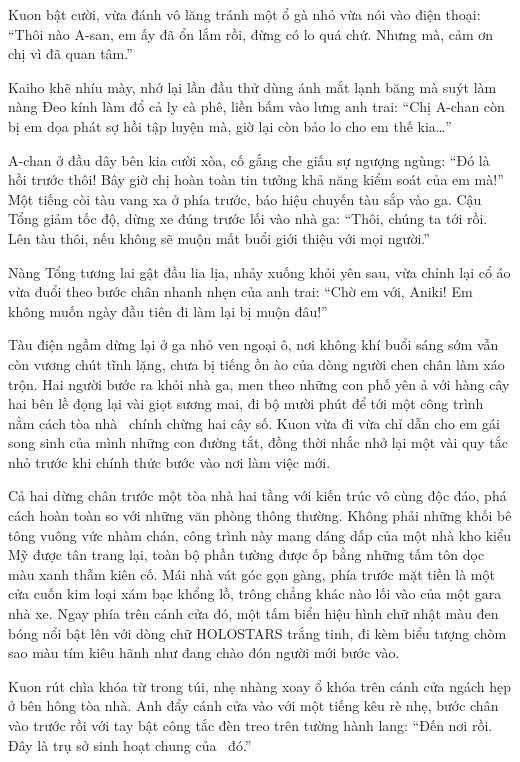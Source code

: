 \documentclass[../main.tex]{subfiles}
\begin{document}
Kuon bật cười, vừa đánh vô lăng tránh một ổ gà nhỏ vừa nói vào điện thoại: ``Thôi nào A-san, em ấy đã ổn lắm rồi, đừng có lo quá chứ. Nhưng mà, cảm ơn chị vì đã quan tâm.''

Kaiho khẽ nhíu mày, nhớ lại lần đầu thử dùng ánh mắt lạnh băng mà suýt làm nàng Đeo kính làm đổ cả ly cà phê, liền bấm vào lưng anh trai: ``Chị A-chan còn bị em dọa phát sợ hồi tập luyện mà, giờ lại còn bảo lo cho em thế kia\dots''

A-chan ở đầu dây bên kia cười xòa, cố gắng che giấu sự ngượng ngùng: ``Đó là hồi trước thôi! Bây giờ chị hoàn toàn tin tưởng khả năng kiểm soát của em mà!'' Một tiếng còi tàu vang xa ở phía trước, báo hiệu chuyến tàu sắp vào ga. Cậu Tổng giảm tốc độ, dừng xe đúng trước lối vào nhà ga: ``Thôi, chúng ta tới rồi. Lên tàu thôi, nếu không sẽ muộn mất buổi giới thiệu với mọi người.''

Nàng Tổng tương lai gật đầu lia lịa, nhảy xuống khỏi yên sau, vừa chỉnh lại cổ áo vừa đuổi theo bước chân nhanh nhẹn của anh trai: ``Chờ em với, Aniki! Em không muốn ngày đầu tiên đi làm lại bị muộn đâu!''

\ct

Tàu điện ngầm dừng lại ở ga nhỏ ven ngoại ô, nơi không khí buổi sáng sớm vẫn còn vương chút tĩnh lặng, chưa bị tiếng ồn ào của dòng người chen chân làm xáo trộn. Hai người bước ra khỏi nhà ga, men theo những con phố yên ả với hàng cây hai bên lề đọng lại vài giọt sương mai, đi bộ mười phút để tới một công trình nằm cách tòa nhà \hll\ chính chừng hai cây số. Kuon vừa đi vừa chỉ dẫn cho em gái song sinh của mình những con đường tắt, đồng thời nhắc nhở lại một vài quy tắc nhỏ trước khi chính thức bước vào nơi làm việc mới.

Cả hai dừng chân trước một tòa nhà hai tầng với kiến trúc vô cùng độc đáo, phá cách hoàn toàn so với những văn phòng thông thường. Không phải những khối bê tông vuông vức nhàm chán, công trình này mang dáng dấp của một nhà kho kiểu Mỹ được tân trang lại, toàn bộ phần tường được ốp bằng những tấm tôn dọc màu xanh thẫm kiên cố. Mái nhà vát góc gọn gàng, phía trước mặt tiền là một cửa cuốn kim loại xám bạc khổng lồ, trông chẳng khác nào lối vào của một gara nhà xe. Ngay phía trên cánh cửa đó, một tấm biển hiệu hình chữ nhật màu đen bóng nổi bật lên với dòng chữ HOLOSTARS trắng tinh, đi kèm biểu tượng chòm sao màu tím kiêu hãnh như đang chào đón người mới bước vào.


Kuon rút chìa khóa từ trong túi, nhẹ nhàng xoay ổ khóa trên cánh cửa ngách hẹp ở bên hông tòa nhà. Anh đẩy cánh cửa vào với một tiếng kêu rè nhẹ, bước chân vào trước rồi với tay bật công tắc đèn treo trên tường hành lang: ``Đến nơi rồi. Đây là trụ sở sinh hoạt chung của \hls\ đó.''
\end{document}
